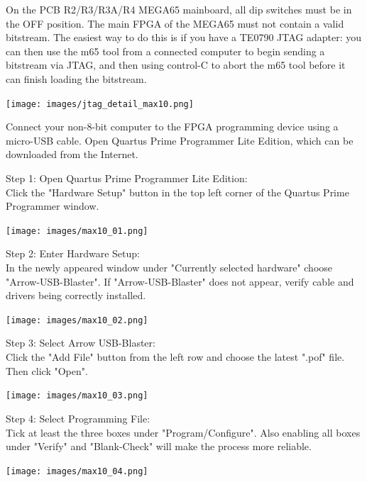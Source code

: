 On the PCB R2/R3/R3A/R4 MEGA65 mainboard, all dip switches must be in the OFF position. The main FPGA of the MEGA65 must not contain
a valid bitstream. The easiest way to do this is if you have a TE0790 JTAG adapter: you can then use the m65 tool from a connected computer to begin sending a bitstream via JTAG, and then using control-C to abort the m65 tool before it can finish loading the bitstream.

\texttt{[image: images/jtag\_detail\_max10.png]}

Connect your non-8-bit computer to the FPGA programming device using a micro-USB cable.
Open Quartus Prime Programmer Lite Edition, which can be downloaded from the Internet.

\begin{minipage}{\linewidth}
Step 1: Open Quartus Prime Programmer Lite Edition: \\
Click the "Hardware Setup" button in the top left corner of
the Quartus Prime Programmer window.
  \begin{center}
  \texttt{[image: images/max10\_01.png]}
  \end{center}
\end{minipage}

\vspace{5mm}

\begin{minipage}{\linewidth}
Step 2: Enter Hardware Setup: \\
In the newly appeared window under "Currently selected
hardware" choose "Arrow-USB-Blaster".
If "Arrow-USB-Blaster" does not appear, verify cable and
drivers being correctly installed.
  \begin{center}
  \texttt{[image: images/max10\_02.png]}
  \end{center}
\end{minipage}


\begin{minipage}{\linewidth}
Step 3: Select Arrow USB-Blaster: \\
Click the "Add File" button from the left row and choose the
latest ".pof" file. Then click "Open".
  \begin{center}
  \texttt{[image: images/max10\_03.png]}
  \end{center}
\end{minipage}


\begin{minipage}{\linewidth}
Step 4: Select Programming File: \\
Tick at least the three boxes under "Program/Configure".
Also enabling all boxes under "Verify" and "Blank-Check"
will make the process more reliable.
  \begin{center}
  \texttt{[image: images/max10\_04.png]}
  \end{center}
\end{minipage}

